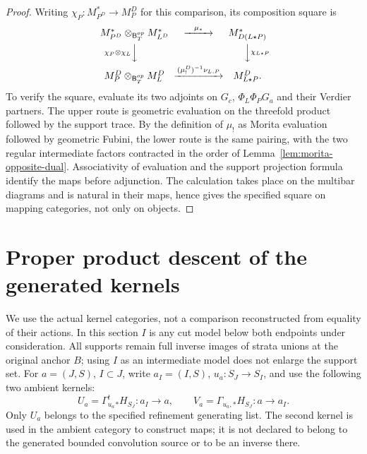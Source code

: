 \documentclass[11pt]{article}
\theoremstyle{definition}
\theoremstyle{remark}
\begin{document}
\begin{proof}
Writing $\chi_P:M_{P^D}^*\to M_P^D$ for this comparison, its
composition square is
\begin{equation}
\begin{CD}
 M_{P^D}^*\otimes_{\mathsf B_T^{op}}M_{L^D}^*
          @>{\mu_*}>> M_{D(L\star P)}^*\\
 @V{\chi_P\otimes\chi_L}VV @VV{\chi_{L\star P}}V\\
 M_P^D\otimes_{\mathsf B_T^{op}}M_L^D
          @>{(\mu_!^D)^{-1}\nu_{L,P}}>> M_{L\star P}^D .
\end{CD}
\label{eq:geometric-morita-mate-square}
\end{equation}
To verify the square, evaluate its two adjoints on
$G_c$, $\Phi_L\Phi_PG_a$ and their Verdier partners.  The upper
route is geometric evaluation on the threefold product followed
by the support trace.  By the definition of $\mu_!$ as Morita
evaluation followed by geometric Fubini, the lower route is the
same pairing, with the two regular intermediate factors contracted
in the order of Lemma~\ref{lem:morita-opposite-dual}.  Associativity
of evaluation and the support projection formula identify the
maps before adjunction.  The calculation takes place on the
multibar diagrams and is natural in their maps, hence gives the
specified square on mapping categories, not only on objects.
\end{proof}

\section{Proper product descent of the generated kernels}
\label{sec:product-descent}
We use the actual kernel categories, not a comparison reconstructed
from equality of their actions.  In this section $I$ is any cut model
below both endpoints under consideration.  All supports remain full
inverse images of strata unions at the original anchor $B$; using
$I$ as an intermediate model does not enlarge the support set.
For $a=(J,S)$, $I\subset J$, write $a_I=(I,S)$,
$u_a:S_J\to S_I$, and use the following two ambient kernels:
\[
 U_a=\Gamma_{u_a}^{t}{}_*H_{S_J}:a_I\to a,
 \qquad V_a=\Gamma_{u_a,*}H_{S_J}:a\to a_I.
\]
Only $U_a$ belongs to the specified refinement generating list.
The second kernel is used in the ambient category to construct maps;
it is not declared to belong to the generated bounded convolution
source or to be an inverse there.
\end{document}

